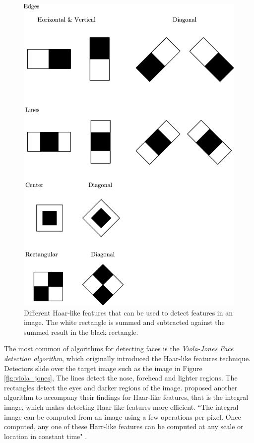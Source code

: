 \documentclass[report, 11pt, oneside]{dissertation}
\begin{document}
\begin{figure}[!htb]
	\centering
	\includegraphics[scale=0.50]{figure_22.pdf}
	\caption[Different Haar-like features.]{Different Haar-like features that can be used to detect features in an image. The white rectangle is summed and subtracted against the summed result in the black rectangle.}
	\label{fig:haar_like}
\end{figure}

The most common of algorithms for detecting faces  is the \textit{Viola-Jones Face detection algorithm}, which originally introduced the Haar-like features technique. Detectors slide over the target image such as the image in Figure \ref{fig:viola_jones}, The lines detect the nose, forehead and lighter regions. The rectangles detect the eyes and darker regions of the image. \citep{Viola:2001ks} proposed another algorithm to accompany their findings for Haar-like features, that is the integral image, which makes detecting Haar-like features more efficient. ``The integral image can be computed from an image using a few operations per pixel. Once computed, any one of these Harr-like features can be computed at any scale or location in constant time" \citep[1]{Viola:2001ks}.
\end{document}
